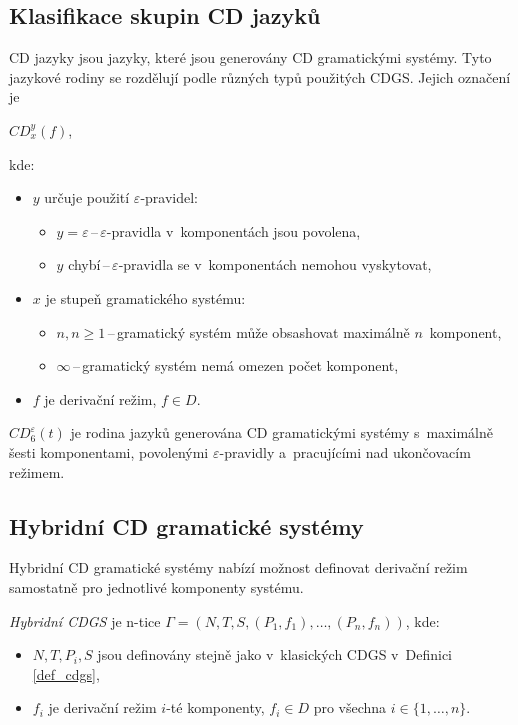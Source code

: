 \subsection*{Klasifikace skupin CD jazyků}
CD jazyky jsou jazyky, které jsou generovány CD gramatickými systémy.
Tyto jazykové rodiny se rozdělují podle různých typů použitých CDGS.
Jejich označení je
\begin{center}
    $CD^y_x(f)$,
\end{center}
kde:
\begin{itemize}
    \item $y$ určuje použití $\varepsilon$-pravidel: 
    \begin{itemize}[label=$\circ$]
        \item $y = \varepsilon$\,--\,$\varepsilon$-pravidla v~komponentách jsou povolena,
        \item $y$ chybí\,--\,$\varepsilon$-pravidla se v~komponentách nemohou vyskytovat,
    \end{itemize}
    \item $x$ je stupeň gramatického systému:
    \begin{itemize}[label=$\circ$]
        \item $n, n \geq 1$\,--\,gramatický systém může obsashovat maximálně $n$~komponent,
        \item $\infty$\,--\,gramatický systém nemá omezen počet komponent,
    \end{itemize}
    \item $f$ je derivační režim, $f \in D$.
\end{itemize}
\begin{example}
    $CD^\varepsilon_6 (t)$ je rodina jazyků generována CD gramatickými systémy s~maximálně šesti komponentami, povolenými $\varepsilon$-pravidly a~pracujícími nad ukončovacím režimem. 
\end{example}

\subsection*{Hybridní CD gramatické systémy}
Hybridní CD gramatické systémy nabízí možnost definovat derivační režim samostatně pro jednotlivé komponenty systému.
\begin{definition}
    \emph{Hybridní CDGS} je n-tice $\Gamma = (N, T, S, (P_1, f_1), \ldots, (P_n, f_n))$, kde:
    \begin{itemize}
        \item $N, T, P_i, S$ jsou definovány stejně jako v~klasických CDGS v~Definici \ref{def_cdgs},
        \item $f_i$ je derivační režim $i$-té komponenty, $f_i \in D$ pro všechna $i \in \{1, \ldots, n\}$.
    \end{itemize}
\end{definition}

